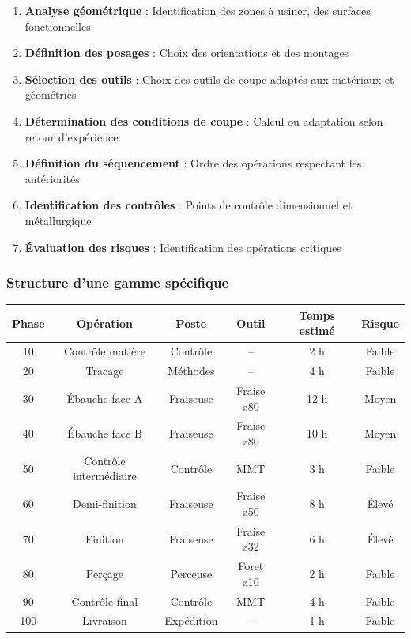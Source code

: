 \documentclass{article}
\begin{document}
\begin{enumerate}
    \item \textbf{Analyse géométrique} : Identification des zones à usiner, des surfaces fonctionnelles
    \item \textbf{Définition des posages} : Choix des orientations et des montages
    \item \textbf{Sélection des outils} : Choix des outils de coupe adaptés aux matériaux et géométries
    \item \textbf{Détermination des conditions de coupe} : Calcul ou adaptation selon retour d'expérience
    \item \textbf{Définition du séquencement} : Ordre des opérations respectant les antériorités
    \item \textbf{Identification des contrôles} : Points de contrôle dimensionnel et métallurgique
    \item \textbf{Évaluation des risques} : Identification des opérations critiques
\end{enumerate}

\subsubsection{Structure d'une gamme spécifique}

\begin{tcolorbox}[colback=orangeclair, colframe=orange!70!black, title=Exemple : Gamme spécifique pour pièce aéronautique]
\begin{tabular}{|c|c|c|c|c|c|}
\hline
\textbf{Phase} & \textbf{Opération} & \textbf{Poste} & \textbf{Outil} & \textbf{Temps estimé} & \textbf{Risque} \\
\hline
10 & Contrôle matière & Contrôle & -- & 2 h & Faible \\
20 & Tracage & Méthodes & -- & 4 h & Faible \\
30 & Ébauche face A & Fraiseuse & Fraise ø80 & 12 h & Moyen \\
40 & Ébauche face B & Fraiseuse & Fraise ø80 & 10 h & Moyen \\
50 & Contrôle intermédiaire & Contrôle & MMT & 3 h & Faible \\
60 & Demi-finition & Fraiseuse & Fraise ø50 & 8 h & Élevé \\
70 & Finition & Fraiseuse & Fraise ø32 & 6 h & Élevé \\
80 & Perçage & Perceuse & Foret ø10 & 2 h & Faible \\
90 & Contrôle final & Contrôle & MMT & 4 h & Faible \\
100 & Livraison & Expédition & -- & 1 h & Faible \\
\hline
\end{tabular}
\end{tcolorbox}
\end{document}
